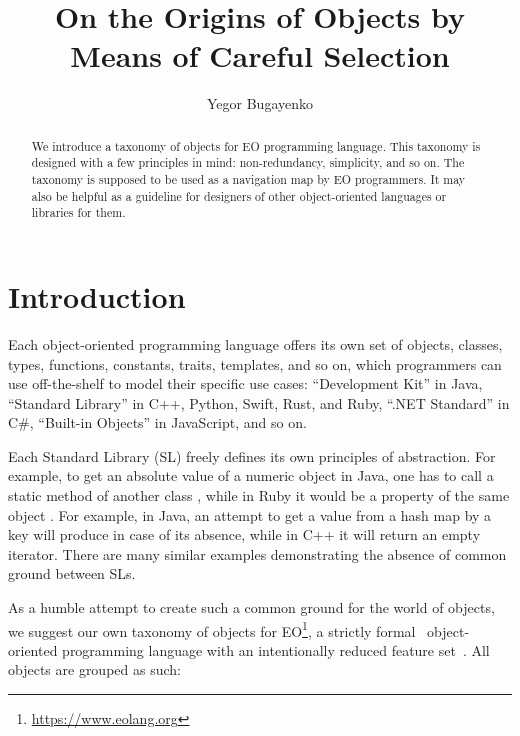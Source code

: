 \documentclass[sigplan,11pt,nonacm,natbib=false]{acmart}
\title{On the Origins of Objects by Means of Careful Selection}
\author{Yegor Bugayenko}
\affiliation{
  \institution{Huawei}
  \country{Russia}
  \city{Moscow}
}
\begin{document}
\raggedbottom

\begin{abstract}
We introduce a taxonomy of objects for EO programming language. This taxonomy is designed with a few principles in mind: non-redundancy, simplicity, and so on. The taxonomy is supposed to be used as a navigation map by EO programmers. It may also be helpful as a guideline for designers of other object-oriented languages or libraries for them.
\end{abstract}

\maketitle

\section{Introduction}

Each object-oriented programming language offers its own set of objects, classes, types, functions, constants, traits, templates, and so on, which programmers can use off-the-shelf to model their specific use cases:
``Development Kit'' in Java,
``Standard Library'' in C++, Python, Swift, Rust, and Ruby,
``.NET Standard'' in C\#,
``Built-in Objects'' in JavaScript,
and so on.

Each Standard Library (SL) freely defines its own principles of abstraction. For example, to get an absolute value of a numeric object  in Java, one has to call a static method of another class , while in Ruby it would be a property of the same object . For example, in Java, an attempt to get a value from a hash map by a key will produce  in case of its absence, while in C++ it will return an empty iterator. There are many similar examples demonstrating the absence of common ground between SLs.

As a humble attempt to create such a common ground for the world of objects, we suggest our own taxonomy of objects for EO\footnote{\url{https://www.eolang.org}}, a strictly formal~\citep{kudasov2021} object-oriented programming language with an intentionally reduced feature set~\citep{bugayenko2021eolang}. All objects are grouped as such:
\end{document}
